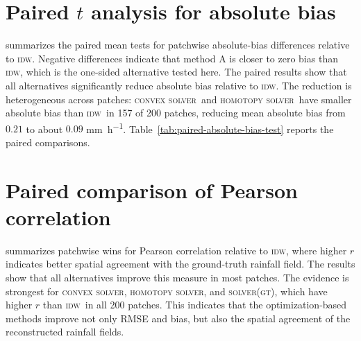 \documentclass[a4paper,fleqn]{cas-sc}
\DeclareRobustCommand{\IDW}{\textsc{idw}}
\DeclareRobustCommand{\solverGT}{\textsc{solver(gt)}}
\DeclareRobustCommand{\solverConvex}{\textsc{convex solver}}
\DeclareRobustCommand{\solverHomotopy}{\textsc{homotopy solver}}
\DeclareRobustCommand{\ConvexSolver}{\solverConvex}
\DeclareRobustCommand{\Homotopy}{\solverHomotopy}
\begin{document}


\section*{Paired $t$ analysis for absolute bias}

 summarizes the paired mean tests for patchwise absolute-bias differences relative to \IDW. Negative differences indicate that method A is closer to zero bias than \IDW, which is the one-sided alternative tested here. The paired results show that all alternatives significantly reduce absolute bias relative to \IDW. The reduction is heterogeneous across patches: \ConvexSolver\ and \Homotopy\ have smaller absolute bias than \IDW\ in 157 of 200 patches, reducing mean absolute bias from $0.21$ to about $0.09$ \si{\milli\meter\per\hour}. Table~\ref{tab:paired-absolute-bias-test} reports the paired comparisons.



\section*{Paired comparison of Pearson correlation}

 summarizes patchwise wins for Pearson correlation relative to \IDW, where higher $r$ indicates better spatial agreement with the ground-truth rainfall field.  The results show that all alternatives improve this measure in most patches. The evidence is strongest for \ConvexSolver, \Homotopy, and \solverGT, which have higher $r$ than \IDW\ in all 200 patches. This indicates that the optimization-based methods improve not only RMSE and bias, but also the spatial agreement of the reconstructed rainfall fields.



\end{document}
